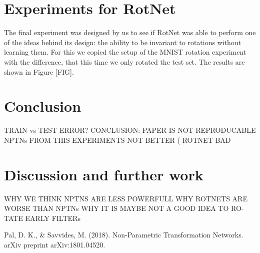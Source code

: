 \documentclass{llncs}
\begin{document}
\section{Experiments for RotNet}
The final experiment was designed by us to see if RotNet was able to perform one of the ideas behind its design: the ability to be invariant to rotations without learning them. For this we copied the setup of the MNIST rotation experiment with the difference, that this time we only rotated the test set. The results are shown in Figure [FIG]. 


\section{Conclusion}
TRAIN vs TEST ERROR?
CONCLUSION: PAPER IS NOT REPRODUCABLE NPTNs FROM THIS
EXPERIMENTS NOT BETTER ( ROTNET BAD
\section{Discussion and further work}
WHY WE THINK NPTNS ARE LESS POWERFULL WHY ROTNETS ARE
WORSE THAN NPTNs WHY IT IS MAYBE NOT A GOOD IDEA TO RO-
TATE EARLY FILTERs
%
%
\begin{thebibliography}{}
%
 Pal, D. K., \& Savvides, M. (2018). Non-Parametric Transformation Networks. arXiv preprint arXiv:1801.04520.
\end{thebibliography}
%
\end{document}
